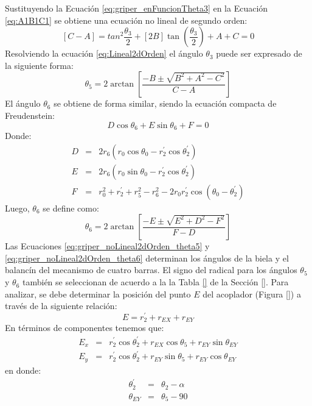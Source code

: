 Sustituyendo la Ecuación \ref{eq:griper_enFuncionTheta3} en la Ecuación \ref{eq:A1B1C1} se obtiene una ecuación no lineal de segundo orden:
\begin{equation} \label{eq:griper_Lineal2dOrden}
 \left[C-A\right]= tan^2{\frac{\theta_3}{2}}+\left[2B\right]\tan{(\frac{\theta_3}{2})}+A+C=0
\end{equation}
Resolviendo la ecuación \ref{eq:Lineal2dOrden} el ángulo $\theta_3$ puede ser expresado de la siguiente forma:
\begin{equation} \label{eq:griper_noLineal2dOrden_theta5}
\theta_5= 2\arctan \left[ \frac{-B \pm \sqrt{B^2+A^2-C^2}}{C-A} \right]
\end{equation}
El ángulo $\theta_6$ se obtiene de forma similar, siendo la ecuación compacta de Freudenstein:
\begin{equation} \label{eq:griper_A1B1C1}
 D\cos{\theta_6}+E\sin{\theta_6}+F=0 
\end{equation}
Donde:
\begin{eqnarray}
D&=& 2r_6(r_0\cos{\theta_0}-r^{\prime}_2\cos{\theta^{\prime}_2}) \label{eq:griper_A} \\
E&=& 2r_6(r_0\sin{\theta_0}-r^{\prime}_2\cos{\theta^{\prime}_2}) \label{eq:griper_B} \\
F&=& r_0^2+r^{\prime}_2+r_5^2-r_6^2 -2r_0r^{\prime}_2\cos(\theta_0-\theta^{\prime}_2) \label{eq:griper_C}
\end{eqnarray}
Luego, $\theta_6$ se define como:
\begin{equation} \label{eq:griper_noLineal2dOrden_theta6}
\theta_6= 2\arctan \left[ \frac{-E \pm \sqrt{E^2+D^2-F^2}}{F-D} \right]
\end{equation}
Las Ecuaciones \ref{eq:griper_noLineal2dOrden_theta5} y \ref{eq:griper_noLineal2dOrden_theta6} determinan los ángulos de la biela y el balancín del mecanismo de cuatro barras. El signo del radical para los ángulos $\theta_5$ y $\theta_6$ también se seleccionan de acuerdo a la la Tabla \ref{} de la Sección \ref{}. Para analizar, se debe determinar la posición del punto $E$ del acoplador (Figura \ref{}) a través de la siguiente relación:
\begin{equation} \label{eq:griper_E}
E=r^{\prime}_2+ r_{EX}+r_{EY}
\end{equation}
En términos de componentes tenemos que:
\begin{eqnarray}
E_{x}&=&r^{\prime}_2\cos{\theta^{\prime}_2} +r_{EX}\cos{\theta_5}+r_{EY}\sin{\theta_{EY}} \label{eq:Cxr} \\
E_{y}&=&r^{\prime}_2\cos{\theta^{\prime}_2} +r_{EY}\sin{\theta_5}+r_{EY}\cos{\theta_{EY}}\label{eq:Cyr}
\end{eqnarray}
en donde:
\begin{eqnarray}
\theta^{\prime}_{2} &=& \theta_2-\alpha \\
\theta_{EY} &=& \theta_5-90
\end{eqnarray}


